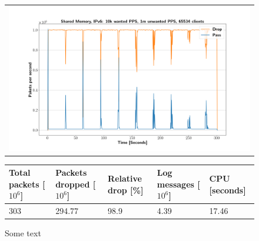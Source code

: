 \begin{figure}[p]
	\label{fig:simplefail2ban:shm:ip6:1m}
	\centering
	\scriptsize
	\begin{tabular}{c}
    	\centerline{\includegraphics[width=1.2\textwidth]{images/simplefail2ban_shm_ipv6_v10k_iv1m_c65534.png}}
	\end{tabular}
	\begin{tabular}{lllll}
		\toprule
		\textbf{Total packets [$10^6$]} & \textbf{Packets dropped [$10^6$]} & \textbf{Relative drop [\%]} & \textbf{Log messages [$10^6$]} & \textbf{CPU [seconds]} \\ \midrule 
		303 & 294.77 & 98.9 & 4.39 & 17.46 \\
		\bottomrule
	\end{tabular}
	\caption[Simplefail2ban, Shared Memory, IPv6, 1m \ac{PPS}]{Some text}
\end{figure}

